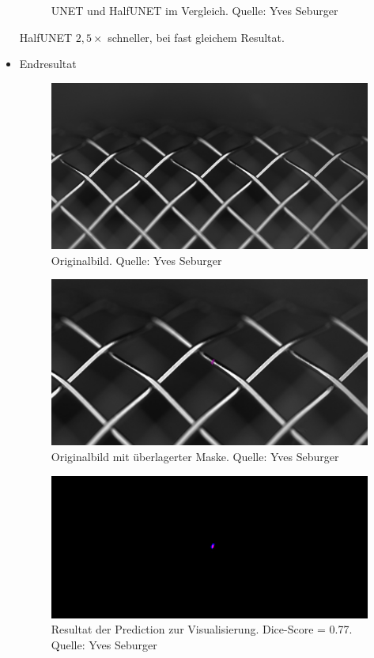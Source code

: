\documentclass{beamer}
\begin{document}
\begin{frame}[allowframebreaks]
\begin{itemize}
\begin{figure}
        \caption{UNET und HalfUNET im Vergleich. \scriptsize{Quelle: Yves Seburger}}
    \end{figure}
    HalfUNET \raisebox{0.5ex}{\texttildelow}$2,5 \times$ schneller, bei fast gleichem Resultat.
    \item Endresultat
    \begin{figure}
        \includegraphics[width=0.9\linewidth]{Bilder/Original.jpeg}
        \caption{Originalbild. \scriptsize{Quelle: Yves Seburger}}
    \end{figure}
    \begin{figure}
        \includegraphics[width=0.95\linewidth]{Bilder/Original_und_Maske.jpeg}
        \caption{Originalbild mit überlagerter Maske. \scriptsize{Quelle: Yves Seburger}}
    \end{figure}
    \begin{figure}
        \includegraphics[width=0.95\linewidth]{Bilder/Prediction_und_Maske.jpeg}
        \caption{Resultat der Prediction zur Visualisierung. \newline Dice-Score = \raisebox{0.5ex}{\texttildelow}0.77. \scriptsize{Quelle: Yves Seburger}}
    \end{figure}
    
\end{itemize}
\end{frame}
\end{document}
